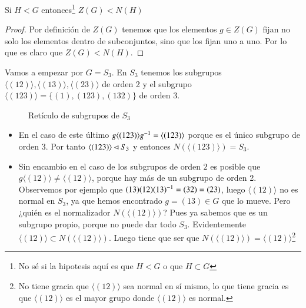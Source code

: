 \begin{pro}
	Si $H < G$ entonces\footnote{No sé si la hipotesis aquí es que $H < G$ o que $H \subset G$} $Z(G) < N(H)$
\end{pro}

\begin{proof}
	Por definición de $Z(G)$ tenemos que los elementos $g \in Z(G)$ fijan no solo los elementos dentro de subconjuntos, sino que los fijan uno a uno. Por lo que es claro que $Z(G) < N(H)$. 
\end{proof}

\begin{ej}
	Vamos a empezar por $G = S_3$. En $S_3$ tenemos los subgrupos $\langle (12) \rangle, \langle (13) \rangle, \langle (23) \rangle$ de orden 2 y el subgrupo $\langle (123) \rangle = \{(1), (123), (132)\}$ de orden 3.
	
	\begin{figure}[h]
		\centering
		\caption{Retículo de subgrupos de $S_3$}
		\label{fig:reticulos3}
	\end{figure}
	\begin{itemize}
		\item En el caso de este último $g\langle (123) \rangle g^{-1} = \langle (123) \rangle$ porque es el único subgrupo de orden 3. Por tanto $\langle (123) \rangle \lhd S_3$ y entonces $N(\langle (123) \rangle) = S_3$.
		\item Sin encambio en el caso de los subgrupos de orden $2$ es posible que $g\langle (12) \rangle \neq \langle (12) \rangle$, porque hay más de un subgrupo de orden 2. Observemos por ejemplo que $(13)(12)(13)^{-1} = (32) = (23)$, luego $\langle (12) \rangle$ no es normal en $S_3$, ya que hemos encontrado $g = (13) \in G$ que lo mueve. Pero ¿quién es el normalizador $N(\langle (12) \rangle)$? Pues ya sabemos que es un subgrupo propio, porque no puede dar todo $S_3$. Evidentemente $\langle (12) \rangle \subset N(\langle (12) \rangle)$. Luego tiene que ser que $N(\langle (12) \rangle) = \langle (12) \rangle$\footnote{No tiene gracia que $\langle (12) \rangle$ sea normal en sí mismo, lo que tiene gracia es que $\langle (12) \rangle$ es el mayor grupo donde $\langle (12) \rangle$ es normal.} 
	\end{itemize}
\end{ej}

